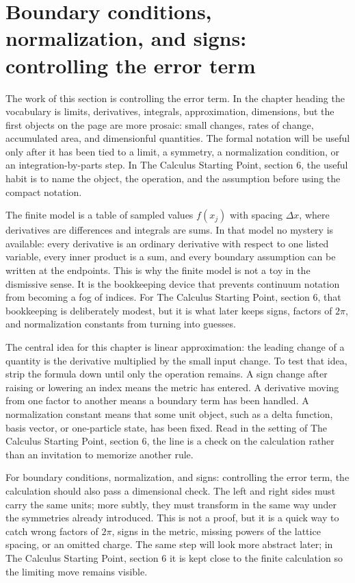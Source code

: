 \section{Boundary conditions, normalization, and signs: controlling the error term}

The work of this section is controlling the error term.  In the chapter heading the vocabulary is limits, derivatives, integrals, approximation, dimensions, but the first objects on the page are more prosaic: small changes, rates of change, accumulated area, and dimensionful quantities.  The formal notation will be useful only after it has been tied to a limit, a symmetry, a normalization condition, or an integration-by-parts step.  In The Calculus Starting Point, section 6, the useful habit is to name the object, the operation, and the assumption before using the compact notation.

The finite model is a table of sampled values \(f(x_j)\) with spacing \(\Delta x\), where derivatives are differences and integrals are sums.  In that model no mystery is available: every derivative is an ordinary derivative with respect to one listed variable, every inner product is a sum, and every boundary assumption can be written at the endpoints.  This is why the finite model is not a toy in the dismissive sense.  It is the bookkeeping device that prevents continuum notation from becoming a fog of indices.  For The Calculus Starting Point, section 6, that bookkeeping is deliberately modest, but it is what later keeps signs, factors of \(2\pi\), and normalization constants from turning into guesses.

The central idea for this chapter is linear approximation: the leading change of a quantity is the derivative multiplied by the small input change.  To test that idea, strip the formula down until only the operation remains.  A sign change after raising or lowering an index means the metric has entered.  A derivative moving from one factor to another means a boundary term has been handled.  A normalization constant means that some unit object, such as a delta function, basis vector, or one-particle state, has been fixed.  Read in the setting of The Calculus Starting Point, section 6, the line is a check on the calculation rather than an invitation to memorize another rule.

For boundary conditions, normalization, and signs: controlling the error term, the calculation should also pass a dimensional check.  The left and right sides must carry the same units; more subtly, they must transform in the same way under the symmetries already introduced.  This is not a proof, but it is a quick way to catch wrong factors of \(2\pi\), signs in the metric, missing powers of the lattice spacing, or an omitted charge.  The same step will look more abstract later; in The Calculus Starting Point, section 6 it is kept close to the finite calculation so the limiting move remains visible.

